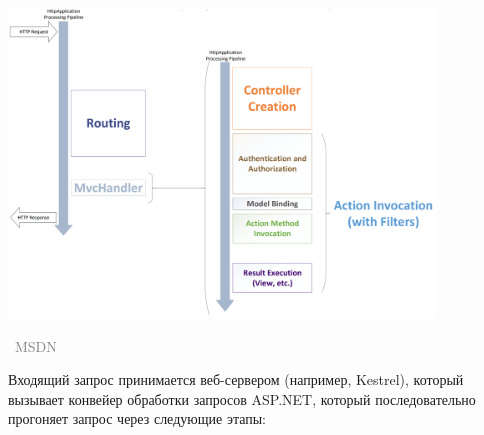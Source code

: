 \documentclass[a5paper]{article}
\newcommand{\attribution}[1] {
\vspace{-5mm}\begin{flushright}\begin{scriptsize}\textcolor{gray}{\textcopyright\, #1}\end{scriptsize}\end{flushright}
}
\begin{document}
\begin{center}
    \includegraphics[width=0.85\textwidth]{requestLifecycle.png}
    \attribution{MSDN}
\end{center}

Входящий запрос принимается веб-сервером (например, Kestrel), который вызывает конвейер обработки запросов ASP.NET, который последовательно прогоняет запрос через следующие этапы:
\end{document}

